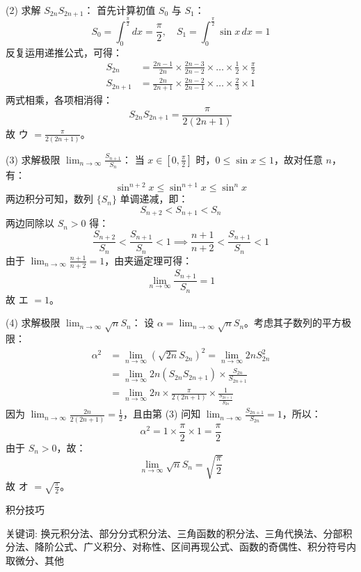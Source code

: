 \begin{questions}
\begin{solution}
\vspace{1em}

(2) 求解 $S_{2n} S_{2n+1}$：
首先计算初值 $S_0$ 与 $S_1$：
\[
S_0 = \int_0^{\frac{\pi}{2}} dx = \frac{\pi}{2}, \quad S_1 = \int_0^{\frac{\pi}{2}} \sin x \, dx = 1
\]
反复运用递推公式，可得：
\begin{align*}
S_{2n} &= \frac{2n-1}{2n} \times \frac{2n-3}{2n-2} \times \dots \times \frac{1}{2} \times \frac{\pi}{2} \\
S_{2n+1} &= \frac{2n}{2n+1} \times \frac{2n-2}{2n-1} \times \dots \times \frac{2}{3} \times 1
\end{align*}
两式相乘，各项相消得：
\[
S_{2n} S_{2n+1} = \frac{\pi}{2(2n+1)}
\]
故 ウ $= \frac{\pi}{2(2n+1)}$。

\vspace{1em}

(3) 求解极限 $\lim_{n \to \infty} \frac{S_{n+1}}{S_n}$：
当 $x \in \left[0, \frac{\pi}{2}\right]$ 时，$0 \le \sin x \le 1$，故对任意 $n$，有：
\[
\sin^{n+2} x \le \sin^{n+1} x \le \sin^n x
\]
两边积分可知，数列 $\{S_n\}$ 单调递减，即：
\[
S_{n+2} < S_{n+1} < S_n
\]
两边同除以 $S_n > 0$ 得：
\[
\frac{S_{n+2}}{S_n} < \frac{S_{n+1}}{S_n} < 1 \implies \frac{n+1}{n+2} < \frac{S_{n+1}}{S_n} < 1
\]
由于 $\lim_{n \to \infty} \frac{n+1}{n+2} = 1$，由夹逼定理可得：
\[
\lim_{n \to \infty} \frac{S_{n+1}}{S_n} = 1
\]
故 エ $= 1$。

\vspace{1em}

(4) 求解极限 $\lim_{n \to \infty} \sqrt{n} S_n$：
设 $\alpha = \lim_{n \to \infty} \sqrt{n} S_n$。考虑其子数列的平方极限：
\begin{align*}
\alpha^2 &= \lim_{n \to \infty} \left( \sqrt{2n} S_{2n} \right)^2 = \lim_{n \to \infty} 2n S_{2n}^2 \\
&= \lim_{n \to \infty} 2n (S_{2n} S_{2n+1}) \times \frac{S_{2n}}{S_{2n+1}} \\
&= \lim_{n \to \infty} 2n \times \frac{\pi}{2(2n+1)} \times \frac{1}{\frac{S_{2n+1}}{S_{2n}}}
\end{align*}
因为 $\lim_{n \to \infty} \frac{2n}{2(2n+1)} = \frac{1}{2}$，且由第 (3) 问知 $\lim_{n \to \infty} \frac{S_{2n+1}}{S_{2n}} = 1$，所以：
\[
\alpha^2 = 1 \times \frac{\pi}{2} \times 1 = \frac{\pi}{2}
\]
由于 $S_n > 0$，故：
\[
\lim_{n \to \infty} \sqrt{n} S_n = \sqrt{\frac{\pi}{2}}
\]
故 オ $= \sqrt{\frac{\pi}{2}}$。
\end{solution}
\end{questions}
\pagebreak

\begin{center}
  {\fontsize{30pt}{26pt}\selectfont
    \hypertarget{积分技巧}{积分技巧} \label{积分技巧}
  }
\end{center}
\separator
\begin{center}
    关键词: 换元积分法、部分分式积分法、三角函数的积分法、三角代换法、分部积分法、降阶公式、广义积分、对称性、区间再现公式、函数的奇偶性、积分符号内取微分、其他
\end{center}
\vspace{0.5pt}

